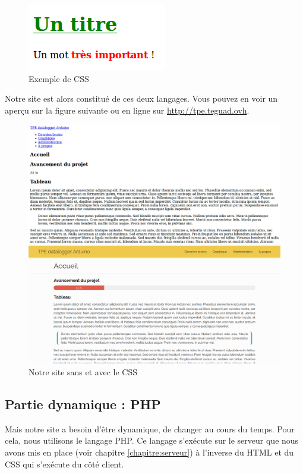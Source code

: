 \begin{figure}[!h]
	\centering
	\includegraphics[width=.2\linewidth]{Images/Exemple_CSS}
	\caption{Exemple de CSS}
\end{figure}

Notre site est alors constitué de ces deux langages. Vous pouvez en voir un aperçu sur la figure suivante ou en ligne sur \url{http://tpe.teguad.ovh}.

\begin{figure}[!h]
	\begin{minipage}{.5\linewidth}
		\centering
		\includegraphics[width=.9\linewidth]{Images/Site_sans_CSS}
	\end{minipage}%
	\begin{minipage}{.5\linewidth}
		\centering
		\includegraphics[width=.9\linewidth]{Images/Site_avec_CSS}
	\end{minipage}
	\caption{Notre site sans et avec le CSS}
\end{figure}

\subsection{Partie dynamique : PHP}

Mais notre site a besoin d'être dynamique, de changer au cours du temps. Pour cela, nous utilisons le langage PHP. Ce langage s'exécute sur le serveur que nous avons mis en place (voir chapitre \ref{chapitre:serveur}) à l'inverse du HTML et du CSS qui s'exécute du côté client.

